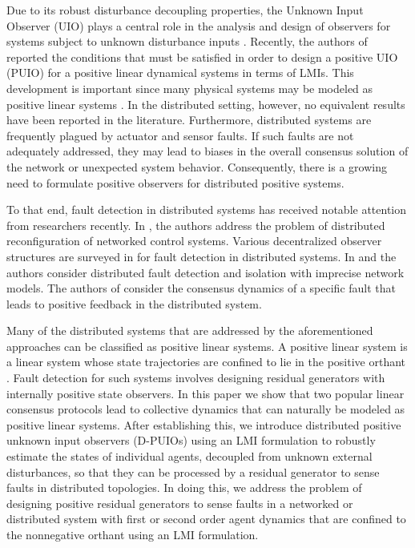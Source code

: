 \documentclass[letterpaper, 10 pt, conference]{ieeeconf}  %
\begin{document}
Due to its robust disturbance decoupling properties, the Unknown Input Observer (UIO) plays a central role in the analysis and design of observers for systems subject to unknown disturbance inputs \cite{p._kudva_n._viswanadham_a._ramakrishna_observers_1980,m._hou_p._muller_design_1992}. Recently, the authors of \cite{shafai_positive_2015} reported the conditions that must be satisfied in order to design a positive UIO (PUIO) for a positive linear dynamical systems in terms of LMIs. This development is important since many physical systems may be modeled as positive linear systems \cite{farina_positive_2000,kaczorek_positive_2002,berman_nonnegative_1989}. In the distributed setting, however, no equivalent results have been reported in the literature.  Furthermore, distributed systems are frequently plagued by actuator and sensor faults. If such faults are not adequately addressed, they may lead to biases in the overall consensus solution of the network or unexpected system behavior.  Consequently, there is a growing need to formulate positive observers for distributed positive systems. 

\medskip

To that end, fault detection in distributed systems has received notable attention from researchers recently. In \cite{teixeira_distributed_2017}, the authors address the problem of distributed reconfiguration of networked control systems.  Various decentralized observer structures are surveyed in \cite{shafai_proportional-integral_2015} for fault detection in distributed systems. In \cite{teixeira_distributed_2014} and \cite{shames_distributed_2012} the authors consider distributed fault detection and isolation with imprecise network models. The authors of \cite{terelius_consensus_2013} consider the consensus dynamics of a specific fault that leads to positive feedback in the distributed system. 

Many of the distributed systems that are addressed by the aforementioned approaches can be classified as positive linear systems. A positive linear system is a linear system whose state trajectories are confined to lie in the positive orthant \cite{farina_positive_2000,kaczorek_positive_2002,berman_nonnegative_1989,dautrebande_positive_1999,shafai_robust_2016}. Fault detection for such systems involves designing residual generators with internally positive state observers. In this paper we show that two popular linear consensus protocols lead to collective dynamics that can naturally be modeled as positive linear systems. After establishing this, we introduce distributed positive unknown input observers (D-PUIOs) using an LMI formulation to robustly estimate the states of individual agents, decoupled from unknown external disturbances, so that they can be processed by a residual generator to sense faults in distributed topologies. In doing this, we address the problem of designing positive residual generators to sense faults in a networked or distributed system with first or second order agent dynamics that are confined to the nonnegative orthant using an LMI formulation. 
\end{document}
